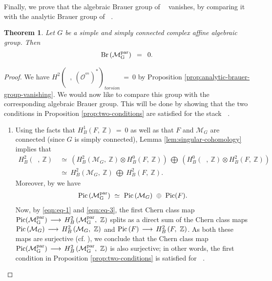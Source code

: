 \documentclass[10pt,reqno]{amsart}
\DeclareMathOperator{\Pic}{\textnormal{Pic}}
\DeclareMathOperator{\Br}{\textnormal{Br}}
\DeclareMathOperator{\mgpar}{\mc{M}_G^{par}}
\newcommand{\mc}[1]{\mathcal{#1}}
\newcommand{\bb}[1]{\mathbb{#1}}
\newtheorem{theorem}{Theorem}[section]
\theoremstyle{myroman}
\numberwithin{equation}{section}
\begin{document}
		Finally, we prove that the algebraic Brauer group of $\mgpar$ vanishes, by comparing it with the analytic Brauer 
		group of $\mgpar$.
		
		\begin{theorem}\label{thm:brauer-group-vanishing}
			Let $G$ be a simple and simply connected complex affine algebraic group.
			Then $$\Br\left(\mgpar\right)\ \,=\ \,0.$$
		\end{theorem}
		
		\begin{proof}
			We have $H^2\left(\mgpar, \ (\mc{O}^{^{an}}_{\mgpar})^*\right)_{torsion}\ =\ 0$ by
			Proposition \ref{prop:analytic-brauer-group-vanishing}. We would now like to compare this group with
			the corresponding algebraic Brauer group. This will be done by showing that the two conditions in
			Proposition \ref{prop:two-conditions} are satisfied for the stack $\mgpar$.
			
			\begin{enumerate}[(1)]
				\item Using the facts that $H^1_B\left(F,\ \bb{Z}\right)\ =\ 0$ as well as that $F$ and $\mc{M}_G$ are
				connected (since $G$ is simply connected), Lemma \ref{lem:singular-cohomology} implies that
				\begin{align}
					H^2_B\left(\mgpar, \ \bb{Z}\right)\ & \simeq\ \left( H^2_B\left(\mc{M}_G,\ \bb{Z}\right)\otimes
					H^0_B\left(F,\ \bb{Z}\right)\right)\ \bigoplus\  \left(H^0_B\left(\mgpar, \ \bb{Z}\right)\otimes H^2_B\left(F,\ \bb{Z}\right)\right)\nonumber\\
					\ &\simeq\ H^2_B\left(\mc{M}_G,\ \bb{Z}\right)\ \bigoplus\ H^2_B\left(F, \ \bb{Z}\right)\label{eqn:eq-1}.
				\end{align}
				Moreover, by \cite[Theorem 1.1 and Proposition 8.7]{LS97} we have
				\begin{align}\label{eqn:eq-3}
					\Pic\left(\mgpar\right)\ \simeq\ \Pic\left(\mc{M}_G\right)\ \oplus\ \Pic(F).
				\end{align}
				Now, by \eqref{eqn:eq-1} and \eqref{eqn:eq-3}, the first Chern class map $\Pic(\mgpar)\,\longrightarrow\,
				H^2_B\left(\mgpar, \ \bb{Z}\right)$ splits as a direct sum of the Chern class maps $\Pic\left(\mc{M}_G\right)
				\,\longrightarrow\, H_B^2\left(\mc{M}_G,\ \bb{Z}\right)$ and $\Pic\left(F\right)\,\longrightarrow
				\,H^2_B\left(F,\ \bb{Z}\right)$. As both these maps are surjective
				(cf. \cite[Proposition 5.1 and Remark 5.2]{Te98}), we conclude  that the Chern class map $\Pic(\mgpar)\,
				\longrightarrow\, H^2_B\left(\mgpar, \ \bb{Z}\right)$ is also surjective; in other words, the first condition in Proposition \ref{prop:two-conditions} is satisfied for $\mgpar$.
				

\end{enumerate}
\end{proof}
\end{document}
